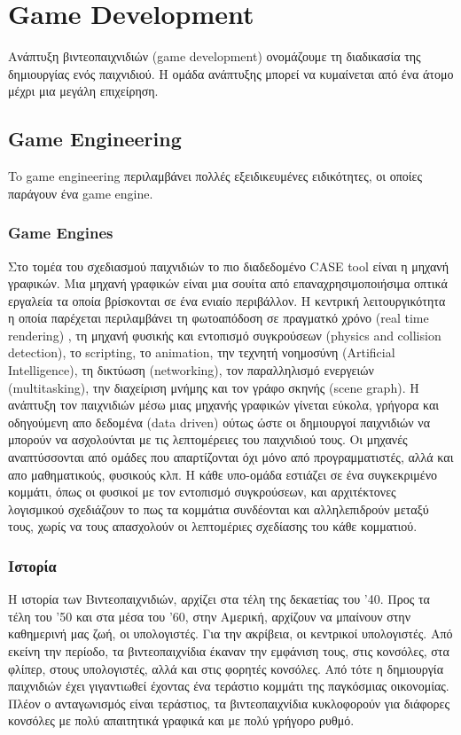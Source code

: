 \chapter{Game Development}
Aνάπτυξη βιντεοπαιχνιδιών (game development) ονομάζουμε τη διαδικασία της δημιουργίας ενός παιχνιδιού. Η ομάδα ανάπτυξης μπορεί να κυμαίνεται από ένα άτομο μέχρι μια μεγάλη επιχείρηση.			
	\section{Game Engineering}
	To game engineering περιλαμβάνει πολλές εξειδικευμένες ειδικότητες, οι οποίες παράγουν ένα game engine.
	\subsection{Game Engines}	
	Στο τομέα του σχεδιασμού παιχνιδιών το πιο διαδεδομένο CASE tool είναι η μηχανή γραφικών. Μια μηχανή γραφικών είναι μια σουίτα από επαναχρησιμοποιήσιμα οπτικά εργαλεία τα οποία βρίσκονται σε ένα ενιαίο περιβάλλον.
	Η κεντρική λειτουργικότητα η οποία παρέχεται περιλαμβάνει τη φωτοαπόδοση σε πραγματκό χρόνο (real time rendering) , τη μηχανή φυσικής και εντοπισμό συγκρούσεων (physics and collision detection), το scripting, το animation, την τεχνητή νοημοσύνη (Artificial Intelligence), τη δικτύωση (networking), τον παραλληλισμό ενεργειών (multitasking), την διαχείριση μνήμης και τον γράφο σκηνής (scene graph). Η ανάπτυξη τον παιχνιδιών μέσω μιας μηχανής γραφικών γίνεται εύκολα, γρήγορα και οδηγούμενη απο δεδομένα (data driven) ούτως ώστε οι δημιουργοί παιχνιδιών να μπορούν να ασχολούνται με τις λεπτομέρειες του παιχνιδιού τους.
	Οι μηχανές αναπτύσσονται από ομάδες που απαρτίζονται όχι μόνο από προγραμματιστές, αλλά και απο μαθηματικούς, φυσικούς κλπ. Η κάθε υπο-ομάδα εστιάζει σε ένα συγκεκριμένο κομμάτι, όπως οι φυσικοί με τον εντοπισμό συγκρούσεων, και αρχιτέκτονες λογισμικού σχεδιάζουν το πως τα κομμάτια συνδέονται και αλληλεπιδρούν μεταξύ τους, χωρίς να τους απασχολούν οι λεπτομέριες σχεδίασης του κάθε κομματιού.
	
	\subsection{Ιστορία}
	Η ιστορία των Βιντεοπαιχνιδιών, αρχίζει στα τέλη της δεκαετίας του '40. Προς τα τέλη του '50 και στα μέσα του '60, στην Αμερική, αρχίζουν να μπαίνουν στην καθημερινή μας ζωή, οι υπολογιστές. Για την ακρίβεια, οι κεντρικοί υπολογιστές. Από εκείνη την περίοδο, τα βιντεοπαιχνίδια έκαναν την εμφάνιση τους, στις κονσόλες, στα φλίπερ, στους υπολογιστές, αλλά και στις φορητές κονσόλες. Από τότε η δημιουργία παιχνιδιών έχει γιγαντιωθεί έχοντας ένα τεράστιο κομμάτι της παγκόσμιας οικονομίας.
	Πλέον ο ανταγωνισμός είναι τεράστιος, τα βιντεοπαιχνίδια κυκλοφορούν για διάφορες κονσόλες με  πολύ απαιτητικά γραφικά και με πολύ γρήγορο ρυθμό.
